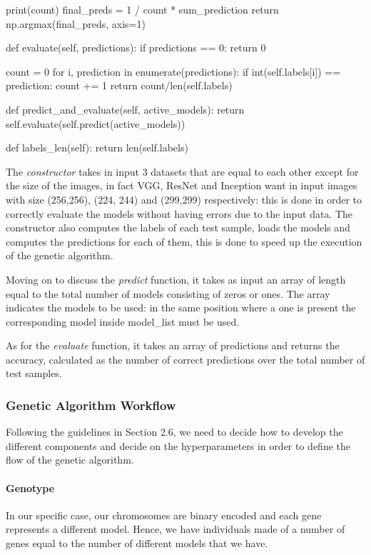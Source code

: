 \begin{python}
        print(count)
        final_preds = 1 / count * sum_prediction
        return np.argmax(final_preds, axis=1)

    def evaluate(self, predictions):
        if predictions == 0:
            return 0

        count = 0
        for i, prediction in enumerate(predictions):
            if int(self.labels[i]) == prediction:
                count += 1
        return count/len(self.labels)

    def predict_and_evaluate(self, active_models):
        return self.evaluate(self.predict(active_models))

    def labels_len(self):
        return len(self.labels)
\end{python}

The \textit{constructor} takes in input 3 datasets that are equal to each other except for the size of the images, in fact VGG, ResNet and Inception want in input images with size (256,256), (224, 244) and (299,299) respectively: this is done in order to correctly evaluate the models without having errors due to the input data. The constructor also computes the labels of each test sample, loads the models and computes the predictions for each of them, this is done to speed up the execution of the genetic algorithm.

Moving on to discuss the \textit{predict} function, it takes as input an array of length equal to the total number of models consisting of zeros or ones. The array indicates the models to be used: in the same position where a one is present the corresponding model inside {model\_list} must be used.

As for the \textit{evaluate} function, it takes an array of predictions and returns the accuracy, calculated as the number of correct predictions over the total number of test samples.

\subsubsection{Genetic Algorithm Workflow}
Following the guidelines in Section 2.6, we need to decide how to develop the different components and decide on the hyperparameters in order to define the flow of the genetic algorithm.

\paragraph{Genotype}
In our specific case, our chromosomes are binary encoded and each gene represents a different model. Hence, we have individuals made of a number of genes equal to the number of different models that we have.

